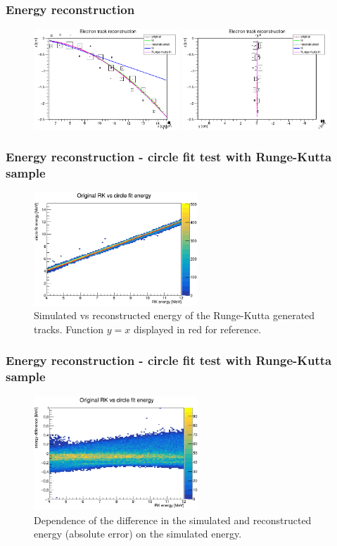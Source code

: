\documentclass{beamer}
\begin{document}
	\begin{frame}
	\frametitle{Energy reconstruction}
		\begin{figure}
			\centering
			\includegraphics[width=0.49\textwidth]{images/track_fits_xz.png}
			\includegraphics[width=0.49\textwidth]{images/track_fits_yz.png}
		\end{figure}
	\end{frame}
	\begin{frame}
	\frametitle{Energy reconstruction - circle fit test with Runge-Kutta sample}
		\begin{figure}
			\centering
			\includegraphics[width=0.55\textwidth]{images/rk_energy.png}
			\caption{Simulated vs reconstructed energy of the Runge-Kutta generated tracks. Function $y=x$ displayed in red for reference.}
		\end{figure}
	\end{frame}
	\begin{frame}
	\frametitle{Energy reconstruction - circle fit test with Runge-Kutta sample}
		\begin{figure}
			\centering
			\includegraphics[width=0.55\textwidth]{images/rk_energy_diff.png}
			\caption{Dependence of the difference in the simulated and reconstructed energy (absolute error) on the simulated energy.}
		\end{figure}
	\end{frame}
\end{document}
